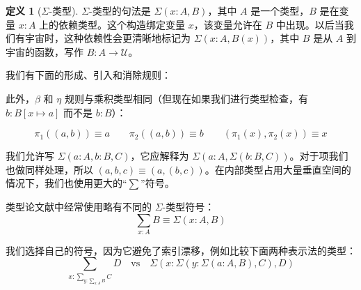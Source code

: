 \documentclass{ctexrep}
\theoremstyle{plain}
\theoremstyle{definition}
\newtheorem{definition}[theorem]{定义}
\theoremstyle{remark}
\theoremstyle{definition}
\theoremstyle{definition}
\theoremstyle{definition}
\begin{document}
\begin{definition}[$\Sigma$-类型]
$\Sigma$-类型的句法是 $\Sigma(x:A,B)$，其中 $A$ 是一个类型，$B$ 是在变量 $x:A$ 上的依赖类型。这个构造绑定变量 $x$，该变量允许在 $B$ 中出现。以后当我们有宇宙时，这种依赖性会更清晰地标记为 $\Sigma(x:A,B(x))$，其中 $B$ 是从 $A$ 到宇宙的函数，写作 $B:A \to \mathcal{U}$。

我们有下面的形成、引入和消除规则：

此外，$\beta$ 和 $\eta$ 规则与乘积类型相同（但现在如果我们进行类型检查，有 $b:B[x\mapsto a]$ 而不是 $b:B$）：

\[
\pi_1((a,b))\equiv a \qquad \pi_2((a,b))\equiv b \qquad (\pi_1(x),\pi_2(x))\equiv x
\]

我们允许写 $\Sigma(a:A,b:B,C)$，它应解释为 $\Sigma(a:A,\Sigma(b:B,C))$。对于项我们也做同样处理，所以 $(a,b,c)\equiv (a,(b,c))$。在内部类型占用大量垂直空间的情况下，我们也使用更大的“$\sum$”符号。

类型论文献中经常使用略有不同的 $\Sigma$-类型符号：
\[
\sum_{x:A}B \equiv \Sigma(x:A,B)
\]

我们选择自己的符号，因为它避免了索引漂移，例如比较下面两种表示法的类型：
\[
\sum_{x:\sum_{y:\sum_{a:A}B}C}D \quad \text{vs} \quad \Sigma(x:\Sigma(y:\Sigma(a:A,B),C),D)
\]
\end{definition}
\end{document}

